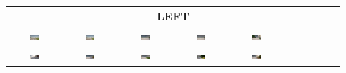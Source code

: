 \begin{figure}[htbp]
    \begin{tabular}{cccccccccc}
        \multicolumn{10}{c}{\textbf{LEFT}} \\
        \includegraphics[width=0.2\textwidth]{img/diversity/left_01.png} &
        \includegraphics[width=0.2\textwidth]{img/diversity/left_02.png} &
        \includegraphics[width=0.2\textwidth]{img/diversity/left_07.png} &
        \includegraphics[width=0.2\textwidth]{img/diversity/left_04.png} &
        \includegraphics[width=0.2\textwidth]{img/diversity/left_09.png} & \\
        \includegraphics[width=0.2\textwidth]{img/diversity/left_06.png} &
        \includegraphics[width=0.2\textwidth]{img/diversity/left_03.png} &
        \includegraphics[width=0.2\textwidth]{img/diversity/left_08.png} &
        \includegraphics[width=0.2\textwidth]{img/diversity/left_05.png} &
        \includegraphics[width=0.2\textwidth]{img/diversity/left_10.png} \\
        

\end{tabular}
\end{figure}
